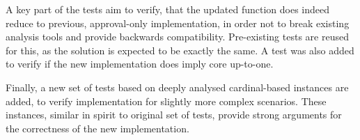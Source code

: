 A key part of the tests aim to verify, that the updated function does indeed reduce to previous, approval-only implementation, in order not to break existing analysis tools and provide backwards compatibility. Pre-existing tests are reused for this, as the solution is expected to be exactly the same. A test was also added to verify if the new implementation does imply core up-to-one.

Finally, a new set of tests based on deeply analysed cardinal-based instances are added, to verify implementation for slightly more complex scenarios. These instances, similar in spirit to original set of tests, provide strong arguments for the correctness of the new implementation.
